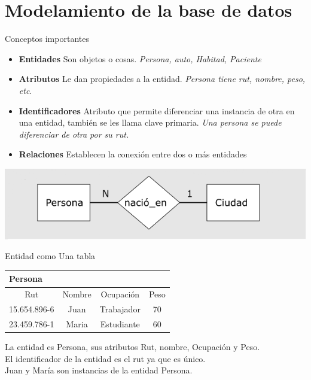 \documentclass[11pt]{beamer}
\begin{document}
\section{Modelamiento de la base de datos}





\begin{frame}{Conceptos importantes }
\begin{itemize}

\item \textbf{Entidades} Son objetos o cosas. \textit{Persona, auto, Habitad, Paciente}

\item \textbf{Atributos} Le dan propiedades a la entidad. \textit{Persona tiene rut, nombre, peso, etc}.

\item \textbf{Identificadores} Atributo que permite diferenciar una instancia de otra en una entidad, también se les llama clave primaria. \textit{Una persona se puede diferenciar de otra por su rut.}

\item  \textbf{Relaciones} Establecen la conexión entre dos o más entidades

\end{itemize}


\begin{center}
\includegraphics[scale=0.5]{images/rel.png} 
\end{center}


\end{frame}


\begin{frame}{Entidad como Una tabla}
\begin{table}[!H]
\begin{tabular}{|c|c|c|c|}
\hline
\multicolumn{4}{|l|}{Persona} \\ \hline
\hline 
Rut & Nombre & Ocupación & Peso \\ 
\hline 
15.654.896-6 & Juan & Trabajador & 70 \\ 
\hline 
23.459.786-1 & Maria & Estudiante & 60 \\ 
\hline 
\end{tabular} 
\end{table}

La entidad es Persona, sus atributos Rut, nombre, Ocupación y Peso.\\
El identificador de la entidad es el rut ya que es único.\\
Juan y María son instancias de la entidad Persona.\\

\end{frame}
\end{document}
